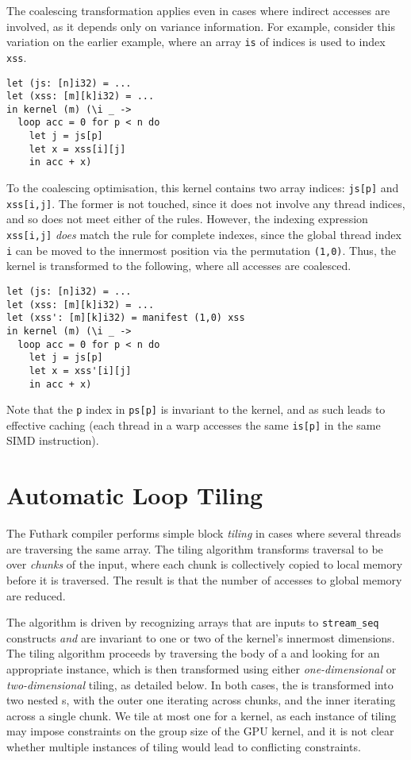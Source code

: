 The coalescing transformation applies even in cases where indirect
accesses are involved, as it depends only on variance information.
For example, consider this variation on the earlier example, where an
array \texttt{is} of indices is used to index \texttt{xss}.

\begin{lstlisting}[numbers=none]
let (js: [n]i32) = ...
let (xss: [m][k]i32) = ...
in kernel (m) (\i _ ->
  loop acc = 0 for p < n do
    let j = js[p]
    let x = xss[i][j]
    in acc + x)
\end{lstlisting}

To the coalescing optimisation, this kernel contains two array
indices: \texttt{js[p]} and \texttt{xss[i,j]}.  The former is not
touched, since it does not involve any thread indices, and so does not
meet either of the rules.  However, the indexing expression
\texttt{xss[i,j]} \textit{does} match the rule for complete indexes,
since the global thread index \texttt{i} can be moved to the innermost
position via the permutation \texttt{(1,0)}.  Thus, the kernel is
transformed to the following, where all accesses are coalesced.

\begin{lstlisting}[numbers=none]
let (js: [n]i32) = ...
let (xss: [m][k]i32) = ...
let (xss': [m][k]i32) = manifest (1,0) xss
in kernel (m) (\i _ ->
  loop acc = 0 for p < n do
    let j = js[p]
    let x = xss'[i][j]
    in acc + x)
\end{lstlisting}

Note that the \texttt{p} index in \texttt{ps[p]} is invariant to the
kernel, and as such leads to effective caching (each thread in a warp
accesses the same \texttt{is[p]} in the same SIMD instruction).

\section{Automatic Loop Tiling}
\label{sec:automatic-tiling}

The Futhark compiler performs simple block \textit{tiling} in cases
where several threads are traversing the same array.  The tiling
algorithm transforms traversal to be over \textit{chunks} of the
input, where each chunk is collectively copied to local memory before
it is traversed.  The result is that the number of accesses to global
memory are reduced.

The algorithm is driven by recognizing arrays that are inputs to
\lstinline{stream_seq} constructs \textit{and} are invariant to one or
two of the kernel's innermost dimensions.  The tiling algorithm
proceeds by traversing the body of a  and looking for an
appropriate \StreamSeq{} instance, which is then transformed using
either \textit{one-dimensional} or \textit{two-dimensional} tiling, as
detailed below.  In both cases, the \StreamSeq{} is transformed into
two nested \StreamSeq{}s, with the outer one iterating across chunks,
and the inner iterating across a single chunk.  We tile at most one
\StreamSeq{} for a kernel, as each instance of tiling may impose
constraints on the group size of the GPU kernel, and it is not clear
whether multiple instances of tiling would lead to conflicting
constraints.

